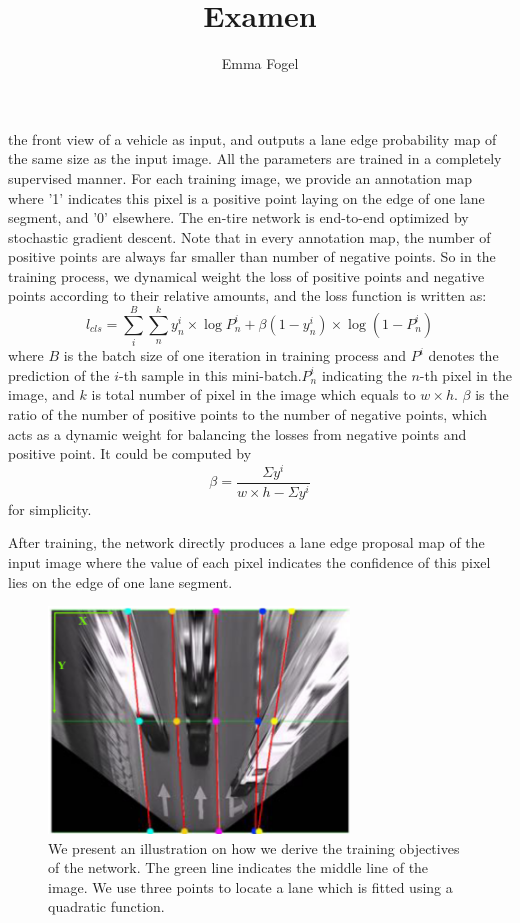 \documentclass[10pt,twocolumn,letterpaper]{article}
\begin{document}
\nocite{*}

\title{Examen}
\author{Emma Fogel}
\maketitle
the front view of a vehicle as input, and outputs a lane edge probability map of the same size as the input image. All the parameters are trained in a completely supervised manner. For each training image, we provide an annotation map where ’1’ indicates this pixel is a positive point laying on the edge of one lane segment, and ’0’ elsewhere.  The en-tire network is end-to-end optimized by stochastic gradient descent.  Note that in every annotation map, the number of positive points are always far smaller than number of negative points. So in the training process, we dynamical weight the loss of positive points and negative points according to their relative amounts, and the loss function is written as:
\begin{equation}
    l_{cls} = \sum_{i}^{B} \sum_{n}^{k} y_{n}^{i} \times \log P_{n}^{i} + \beta(1-y_{n}^{i}) \times \log(1-P_{n}^{i})
\end{equation}
where $B$ is the batch size of one iteration in training process and $P^{i}$ denotes the prediction of the $i$-th sample in this mini-batch.$P_{n}^{i}$ indicating the $n$-th pixel in the image, and $k$ is total  number  of  pixel  in  the  image  which  equals  to $w \times h$. $\beta$ is  the  ratio  of  the  number  of  positive  points  to  the number of negative points, which acts as a dynamic weight for balancing the losses from negative points and positive point. It could be computed by
\begin{equation}
    \beta = \frac{\Sigma y^{i}}{w \times h - \Sigma y^{i}}
\end{equation}
for simplicity.

After training, the network directly produces a lane edge proposal map of the input image where the value of each pixel indicates the confidence of this pixel lies on the edge of one lane segment.
\begin{figure}[H]
    \centering
    \includegraphics[width=8cm]{images/fig1.png}
    \caption{We present an illustration on how we derive the training objectives of the network. The green line indicates the middle line of the image.  We use three points to locate a lane which is fitted using a quadratic function.}
    \label{fig:Fig3}
\end{figure}
\end{document}
